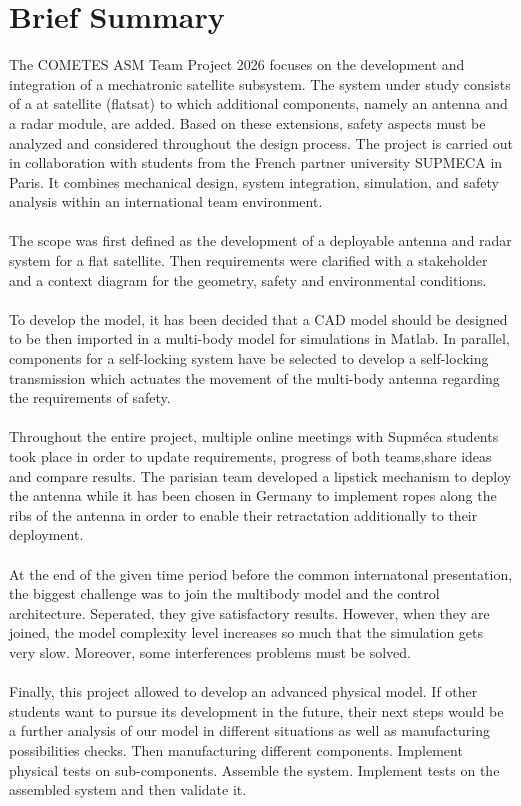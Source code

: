 \chapter*{Brief Summary}
The COMETES ASM Team Project 2026 focuses on the development and integration of a mechatronic satellite subsystem. The system under study consists of a at satellite (flatsat) to which additional components, namely an antenna and a radar module, are added. Based on these extensions, safety aspects must be analyzed and considered throughout the design process. The project is carried out in collaboration with students from the French partner university SUPMECA in Paris. It combines mechanical design, system integration, simulation, and safety analysis within an international team environment.\\
\\
The scope was first defined as the development of a deployable antenna and radar system for a flat satellite. Then requirements were clarified with a stakeholder and a context diagram for the geometry, safety and environmental conditions.\\
\\
To develop the model, it has been decided that a CAD model should be designed to be then imported in a multi-body model for simulations in Matlab.
In parallel, components for a self-locking system have be selected to develop a self-locking transmission which actuates the movement of the multi-body antenna regarding the requirements of safety.\\
\\
Throughout the entire project, multiple online meetings  with Supm\'{e}ca students took place in order to update requirements, progress of both teams,share ideas and compare results. The parisian team developed a lipstick mechanism to deploy the antenna while it has been chosen in Germany to implement ropes along the ribs of the antenna in order to enable their retractation additionally to their deployment.\\
\\
At the end of the given time period before the common internatonal presentation, the biggest challenge was to join the multibody model and the control architecture. Seperated, they give satisfactory results. However, when they are joined, the model complexity level increases so much that the simulation gets very slow. Moreover, some interferences problems must be solved.\\ \\
Finally, this project allowed to develop an advanced physical model. If other students want to pursue its development in the future, their next steps would be a further analysis of our model in different situations as well as manufacturing possibilities checks. Then manufacturing different components. Implement physical tests on sub-components. Assemble the system. Implement tests on the assembled system and then validate it.


